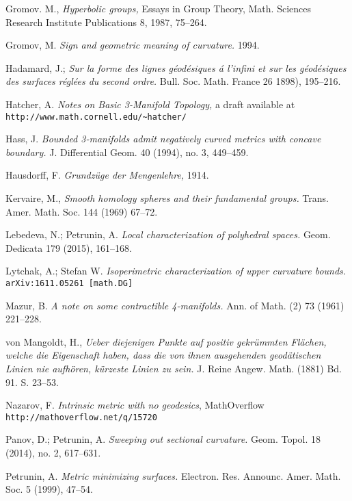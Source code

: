 \begin{thebibliography}{52}
Gromov. M.,
\textit{Hyperbolic groups,} 
Essays in Group Theory,
Math. Sciences Research Institute Publications 8,
1987, 75--264.

Gromov, M.
\textit{Sign and geometric meaning of curvature.}
1994.

Hadamard, J.;
\textit{Sur la forme des lignes g\'eod\'esiques \'a l'infini et sur les g\'eod\'esiques des surfaces r\'egl\'ees du second ordre.}
Bull. Soc. Math. France 
26 
1898), 
195--216.

Hatcher, A. 
\textit{Notes on Basic 3-Manifold Topology,}
a draft available at \verb+http://www.math.cornell.edu/~hatcher/+

 Hass, J.
\textit{Bounded 3-manifolds admit negatively curved metrics with concave boundary.}
J. Differential Geom. 
40 (1994), 
no. 3, 
449--459. 

Hausdorff, F. 
\textit{Grundz\"uge der Mengenlehre,} 
1914.

Kervaire, M., 
\textit{Smooth homology spheres and their fundamental groups.}
Trans. Amer. Math. Soc. 
144 
(1969) 
67--72.

Lebedeva, N.; 
Petrunin, A. 
\textit{Local characterization of polyhedral spaces.} Geom. Dedicata 179 (2015), 161--168.

Lytchak, A.; Stefan W.
\textit{Isoperimetric characterization of upper curvature bounds.}
\texttt{arXiv:1611.05261 [math.DG]}

Mazur, B. 
\textit{A note on some contractible 4-manifolds.} 
Ann. of Math. (2) 
73 
(1961) 
221--228.

von Mangoldt, H., 
\textit{Ueber diejenigen Punkte auf positiv gekr\"ummten Fl\"achen, welche die Eigenschaft haben, dass die von ihnen ausgehenden geod\"atischen Linien nie aufh\"oren, k\"urzeste Linien zu sein.} 
J. Reine Angew. Math. (1881) Bd. 91. S. 23--53.

Nazarov, F.
\textit{Intrinsic metric with no geodesics},
MathOverflow \texttt{http://mathoverflow.net/q/15720}

Panov, D.; Petrunin, A.
\textit{Sweeping out sectional curvature.} 
Geom. Topol. 
18 
(2014), 
no. 2, 
617--631. 

Petrunin, A.
\textit{Metric minimizing surfaces.}
Electron. Res. Announc. Amer. Math. Soc. 
5 
(1999), 
47--54.


\end{thebibliography}
